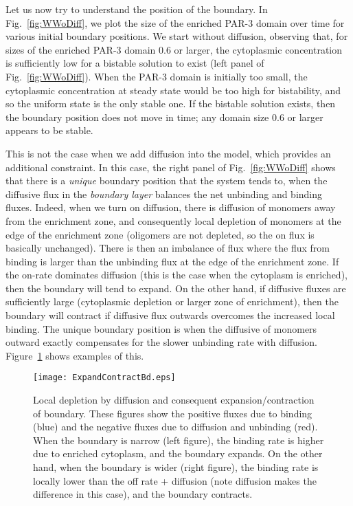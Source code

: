 \documentclass[11pt]{article}
\newcommand{\6}[1]{#1_{\text{6}}}
\newcommand{\3}[1]{#1_{\text{3}}}
\begin{document}
Let us now try to understand the position of the boundary. In Fig.\ \ref{fig:WWoDiff}, we plot the size of the enriched PAR-3 domain over time for various initial boundary positions. We start without diffusion, observing that, for sizes of the enriched PAR-3 domain 0.6 or larger, the cytoplasmic concentration is sufficiently low for a bistable solution to exist (left panel of Fig.\ \ref{fig:WWoDiff}). When the PAR-3 domain is initially too small, the cytoplasmic concentration at steady state would be too high for bistability, and so the uniform state is the only stable one. If the bistable solution exists, then the boundary position does not move in time; any domain size 0.6 or larger appears to be stable.

This is not the case when we add diffusion into the model, which provides an additional constraint. In this case, the right panel of Fig.\ \ref{fig:WWoDiff} shows that there is a \emph{unique} boundary position that the system tends to, when the diffusive flux in the \emph{boundary layer} balances the net unbinding and binding fluxes. Indeed, when we turn on diffusion, there is diffusion of monomers away from the enrichment zone, and consequently local depletion of monomers at the edge of the enrichment zone (oligomers are not depleted, so the on flux is basically unchanged). There is then an imbalance of flux where the flux from binding is larger than the unbinding flux at the edge of the enrichment zone. If the on-rate dominates diffusion (this is the case when the cytoplasm is enriched), then the boundary will tend to expand. On the other hand, if diffusive fluxes are sufficiently large (cytoplasmic depletion or larger zone of enrichment), then the boundary will contract if diffusive flux outwards overcomes the increased local binding. The unique boundary position is when the diffusive of monomers outward exactly compensates for the slower unbinding rate with diffusion. Figure\ \ref{fig:ExpContrBd} shows examples of this.

\begin{figure}
\centering
\texttt{[image: ExpandContractBd.eps]}
\caption{\label{fig:ExpContrBd}Local depletion by diffusion and consequent expansion/contraction of boundary. These figures show the positive fluxes due to binding (blue) and the negative fluxes due to diffusion and unbinding (red). When the boundary is narrow (left figure), the binding rate is higher due to enriched cytoplasm, and the boundary expands. On the other hand, when the boundary is wider (right figure), the binding rate is locally lower than the off rate + diffusion (note diffusion makes the difference in this case), and the boundary contracts. }
\end{figure}
\end{document}
